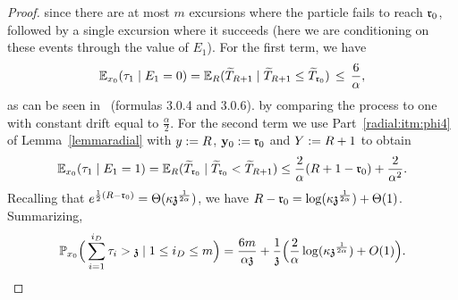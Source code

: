 \begin{proof}
since there are at most $m$ excursions where the particle fails to reach $\rabs_0$, followed by a single excursion where it succeeds (here we are conditioning on these events through the value of $E_1$). For the first term, we have
\[\EE_{x_0}(\tau_1 \mid E_1=0)=\EE_{R}(\widetilde{T}_{R+1} \mid \widetilde{T}_{R+1}\leq \widetilde{T}_{\rabs_0})\,\leq\, \frac{6}{\alpha},\]
as can be seen in~\cite{Borodin2002} (formulas 3.0.4 and 3.0.6).  by comparing the process to one with constant drift equal to $\tfrac{\alpha}{2}$. For the second term we use Part~\eqref{radial:itm:phi4} of Lemma~\ref{lemmaradial} with $\auxy:=R$, $\yabs_0:=\rabs_0$ and $\auxY:=R+1$ to obtain
\[
\EE_{x_0}(\tau_1 \mid E_1=1)=\EE_{R}(\widetilde{T}_{\rabs_0} \mid \widetilde{T}_{\rabs_0}<\widetilde{T}_{R+1})\leq \frac{2}{\alpha}(R+1-\rabs_0)+\frac{2}{\alpha^2}.
\]
Recalling that
$e^{\frac12(R-\rabs_0)}=\Theta(\kappa\ss^\frac{1}{2\alpha})$, 
we have $R-\rabs_0=\log(\kappa\ss^{\frac{1}{2\alpha}})+\Theta(1)$.
Summarizing,
\[\P_{x_0}\Big(\sum_{i=1}^{i_D}\tau_i> \ss\mid 1\leq i_D\leq m\Big)= \frac{6m}{\alpha\ss}+
\frac{1}{\ss}\Big(\frac{2}{\alpha}\log(\kappa\ss^{\frac{1}{2\alpha}})+O(1)\Big).\] 

\end{proof}
